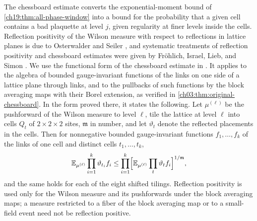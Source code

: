 The chessboard estimate converts the exponential-moment bound of \cref{ch19:thm:all-phase-window} into a bound for the probability that a given cell contains a bad plaquette at level $j$, given regularity at finer levels inside the cells. Reflection positivity of the Wilson measure with respect to reflections in lattice planes is due to Osterwalder and Seiler \cite{OsterwalderSeiler1978}, and systematic treatments of reflection positivity and chessboard estimates were given by Fröhlich, Israel, Lieb, and Simon \cite{FILS1978,FILS1980}. We use the functional form of the chessboard estimate in \cite[Theorem~5.8, (5.34)--(5.35)]{Biskup2009}. It applies to the algebra of bounded gauge-invariant functions of the links on one side of a lattice plane through links, and to the pullbacks of such functions by the block averaging maps with their Borel extension, as verified in \cref{ch03:thm:original-chessboard}. In the form proved there, it states the following. Let $\mu^{(\ell)}$ be the pushforward of the Wilson measure to level $\ell$, tile the lattice at level $\ell$ into cells $Q_t$ of $2\times2\times2$ sites, $\mathfrak m$ in number, and let $\vartheta_t$ denote the reflected placements in the cells. Then for nonnegative bounded gauge-invariant functions $f_1,\dots,f_k$ of the links of one cell and distinct cells $t_1,\dots,t_k$,
\[
 \mathbb E_{\mu^{(\ell)}}\prod_{i=1}^k\vartheta_{t_i}f_i\le\prod_{i=1}^k\Bigl[\mathbb E_{\mu^{(\ell)}}\prod_t\vartheta_tf_i\Bigr]^{1/\mathfrak m},
\]
and the same holds for each of the eight shifted tilings. Reflection positivity is used only for the Wilson measure and its pushforwards under the block averaging maps; a measure restricted to a fiber of the block averaging map or to a small-field event need not be reflection positive.


